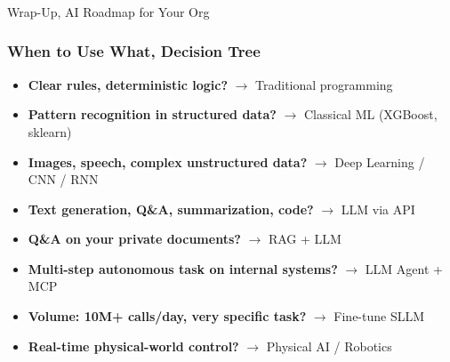 \begin{frame}[fragile]\frametitle{}
\begin{center}
{\Large Wrap-Up, AI Roadmap for Your Org}
\end{center}
\end{frame}

\begin{frame}[fragile]\frametitle{When to Use What, Decision Tree}
\begin{itemize}
\item \textbf{Clear rules, deterministic logic?} $\rightarrow$ Traditional programming
\item \textbf{Pattern recognition in structured data?} $\rightarrow$ Classical ML (XGBoost, sklearn)
\item \textbf{Images, speech, complex unstructured data?} $\rightarrow$ Deep Learning / CNN / RNN
\item \textbf{Text generation, Q\&A, summarization, code?} $\rightarrow$ LLM via API
\item \textbf{Q\&A on your private documents?} $\rightarrow$ RAG + LLM
\item \textbf{Multi-step autonomous task on internal systems?} $\rightarrow$ LLM Agent + MCP
\item \textbf{Volume: 10M+ calls/day, very specific task?} $\rightarrow$ Fine-tune SLLM
\item \textbf{Real-time physical-world control?} $\rightarrow$ Physical AI / Robotics
\end{itemize}
\end{frame}

